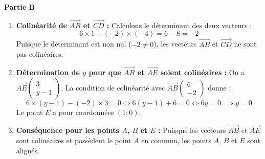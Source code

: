 \documentclass[11pt,a4paper]{article}
\newcommand{\partie}[1]{%
  \vspace{0.9em}%
  \noindent\textbf{#1}%
  \par\vspace{0.3em}%
}
\begin{document}
\partie{Partie B}
\begin{enumerate}
  \item \textbf{Colinéarité de $\vec{AB}$ et $\vec{CD}$ :}
  Calculons le déterminant des deux vecteurs :
  $$6 \times 1 - (-2) \times (-4) = 6 - 8 = -2$$
  Puisque le déterminant est non nul ($-2 \neq 0$), les vecteurs $\vec{AB}$ et $\vec{CD}$ ne sont pas colinéaires.
  \item \textbf{Détermination de $y$ pour que $\vec{AB}$ et $\vec{AE}$ soient colinéaires :}
  On a $\vec{AE}\begin{pmatrix} 3 \\ y - 1 \end{pmatrix}$. La condition de colinéarité avec $\vec{AB}\begin{pmatrix} 6 \\ -2 \end{pmatrix}$ donne :
  $$6 \times (y - 1) - (-2) \times 3 = 0 \iff 6(y - 1) + 6 = 0 \iff 6y = 0 \implies y = 0$$
  Le point $E$ a pour coordonnées $(1 ; 0)$.
  \item \textbf{Conséquence pour les points $A$, $B$ et $E$ :}
  Puisque les vecteurs $\vec{AB}$ et $\vec{AE}$ sont colinéaires et possèdent le point $A$ en commun, les points $A$, $B$ et $E$ sont alignés.
\end{enumerate}
\end{document}
